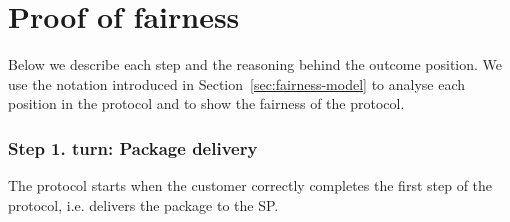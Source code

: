 \documentclass[pdftex,twocolumn,epjc3]{svjour3}
\renewcommand{\sp}{SP}
\begin{document}
\begin{sloppypar}
\section{Proof of fairness}\label{app:proof-of-fairness}
Below we describe each step and the reasoning behind the outcome position.
We use the notation introduced in Section~\ref{sec:fairness-model} to analyse each position in the protocol and to show the fairness of the protocol.

\newcommand{\AgreeablePath}{Agreeable path:}
\newcommand{\DisputePath}{The customer starts a dispute:}
\newcommand{\Fairness}{Fairness:}
\newcommand{\CustomerTurn}[0]{\expandafter\MakeUppercase customer turn:}
\newcommand{\SPTurn}[0]{\sp{} turn:}

\newcommand{\CanFollowToOne}[2]{The #1 can follow the protocol to the non-disadvantaged position #2}
\newcommand{\CanDoNothing}[1]{The #1 can do nothing and always ends up in the non-disadvantaged position}
\newcommand{\CanDoAnything}[1]{The #1 can do anything and always ends up in the non-disadvantaged position}
\newcommand{\Pos}[4]{$\operatorname{\sigma_{#1, #2, #3} = #4}$}
\newcommand{\WinForTheSameReason}[1]{The #1 wins the dispute for the same reason}
\newcommand{\LoseForTheSameReason}[1]{The #1 loses the dispute for the same reason}
\newcommand{\ActedAbnormallyThen}[1]{The #1 acted abnormally, then:}
\newcommand{\CustomerPaidButDidntGetResult}{The customer ends up in a disadvantageous position, because he has paid in advance, but hasn't received the result}
\newcommand{\SpReceivedThePayment}{The SP ends up in the advantageous position, having received the payment}

\newcommand{\CustomerLosesBeforePayment}{The customer loses the dispute because the SP is not obliged to do anything until the transaction is paid}
\newcommand{\CustomerLosesBeforePoP}{The customer loses the dispute because the SP is still able to publish the PoP within the agreed timeframe}

\newcommand{\RemainsIn}[2]{The #1 remains in the #2 position}

\subsubsection*{Step 1. \CustomerTurn{} Package delivery}\label{step-1-deliver-package}

The protocol starts when the customer correctly completes the first step of the protocol, i.e. delivers the package to the SP. 


\end{sloppypar}
\end{document}

